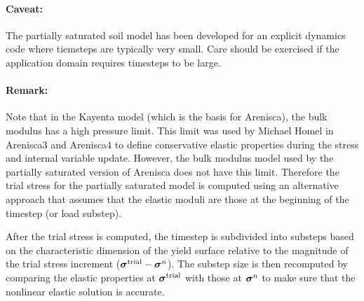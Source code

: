 \paragraph{Caveat:}
The partially saturated soil model has been developed for an explicit dynamics code where 
tiemsteps are typically very small.  Care should be exercised if the application domain
requires timesteps to be large.

\paragraph{Remark:}
{\footnotesize
Note that in the Kayenta model (which is the basis for Arenisca), the bulk modulus has a high pressure 
limit.  This limit was used by Michael Homel in Arenisca3 and Arenisca4 to define conservative elastic
properties during the stress and internal variable update.  However, the bulk modulus model used 
by the partially saturated version of Arenisca does not have this limit.  Therefore the trial stress
for the partially saturated model is computed using an alternative approach that assumes that
the elastic moduli are those at the beginning of the timestep (or load substep).
}

After the trial stress is computed, the timestep is subdivided into substeps based on the 
characteristic dimension of the yield surface relative to the magnitude of the trial stress 
increment ($\boldsymbol{\sigma}^{\text{trial}} - \boldsymbol{\sigma}^n$).  The substep size is then recomputed by comparing the
elastic properties at $\boldsymbol{\sigma}^{\text{trial}}$ with those at $\boldsymbol{\sigma}^n$ to make sure that the nonlinear
elastic solution is accurate.
 
